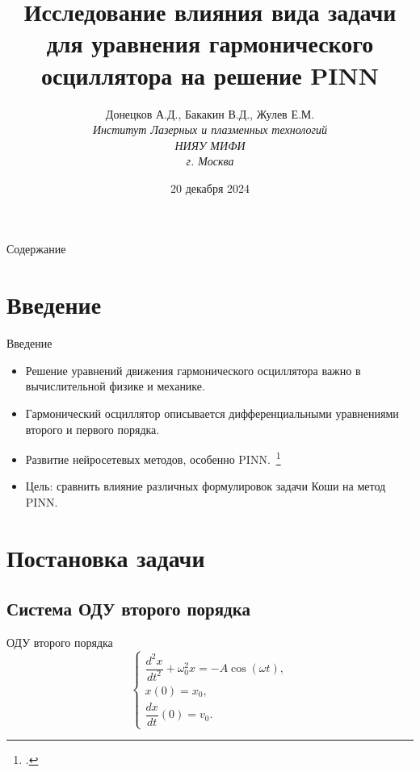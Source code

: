 \documentclass{beamer}
\title{Исследование влияния вида задачи для уравнения гармонического осциллятора на решение PINN}
\author{Донецков А.Д., Бакакин В.Д., Жулев Е.М.\\
\textit{
    Институт Лазерных и плазменных технологий\\
    НИЯУ МИФИ\\
    г. Москва
}}
\date{20 декабря 2024}
\begin{document}
\begin{frame}
    \titlepage
\end{frame}

\begin{frame}{Содержание}
    \tableofcontents
\end{frame}

\section{Введение}
\begin{frame}{Введение}
    \begin{itemize}
        \item Решение уравнений движения гармонического осциллятора важно в вычислительной физике и механике.
        \item Гармонический осциллятор описывается дифференциальными уравнениями второго и первого порядка.
        \item Развитие нейросетевых методов, особенно PINN.~\footcite{Lagaris1998,Raissi2019}
        \item Цель: сравнить влияние различных формулировок задачи Коши на метод PINN.
    \end{itemize}
\end{frame}

\section{Постановка задачи}
\subsection{Система ОДУ второго порядка}
\begin{frame}{ОДУ второго порядка}
    \begin{equation}
    \begin{cases}
    \dfrac{d^2x}{dt^2} + \omega_0^2 x = -A\cos(\omega t), \\
    x(0) = x_0, \\
    \dfrac{dx}{dt}(0) = v_0.
    \end{cases}
    \end{equation}
\end{frame}
\end{document}
